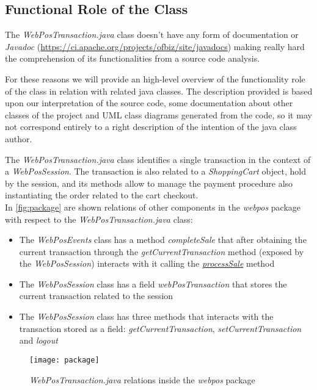 \subsection{Functional Role of the Class}
The \emph{WebPosTransaction.java} class doesn't have any form of documentation or \emph{Javadoc} (\url{https://ci.apache.org/projects/ofbiz/site/javadocs}) making really hard the comprehension of its functionalities from a source code analysis.

For these reasons we will provide an high-level overview of the functionality role of the class in relation with related java classes. The description provided is based upon our interpretation of the source code, some documentation about other classes of the project and UML class diagrams generated from the code, so it may not correspond entirely to a right description of the intention of the java class author.\\

\clearpage

The \emph{WebPosTransaction.java} class identifies a single transaction in the context of a \emph{WebPosSession}. The transaction is also related to a \emph{ShoppingCart} object, hold by the session, and its methods allow to manage the payment procedure also instantiating the order related to the cart checkout. \\

In \autoref{fig:package} are shown relations of other components in the \emph{webpos} package with respect to the \emph{WebPosTransaction.java} class:
\begin{itemize}
	\item The \emph{WebPosEvents} class has a method \emph{completeSale} that after obtaining the current transaction through the \emph{getCurrentTransaction} method (exposed by the \emph{WebPosSession}) interacts with it calling the \hyperref[method:processSale]{\emph{processSale}} method
	\item The \emph{WebPosSession} class has a field \emph{webPosTransaction} that stores the current transaction related to the session
	\item The \emph{WebPosSession} class has three methods that interacts with the transaction stored as a field: \emph{getCurrentTransaction}, \emph{setCurrentTransaction} and \emph{logout}
\end{itemize}

\begin{figure}[h]
			\centering
			\texttt{[image: package]}
			\caption{
				\label{fig:package} 
				\emph{WebPosTransaction.java} relations inside the \emph{webpos} package
			}
\end{figure}

